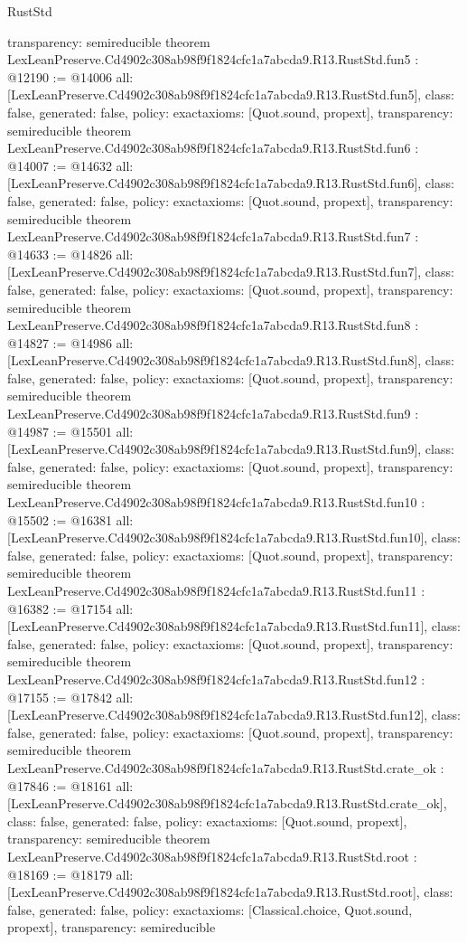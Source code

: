 \begin{lexlean}{RustStd}
\begin{coremodule}
{  transparency: semireducible
}
theorem LexLeanPreserve.Cd4902c308ab98f9f1824cfc1a7abcda9.R13.RustStd.fun5 : @12190 := @14006 {
  all: [LexLeanPreserve.Cd4902c308ab98f9f1824cfc1a7abcda9.R13.RustStd.fun5],
  class: false,
  generated: false,
  policy: exact{axioms: [Quot.sound, propext]},
  transparency: semireducible
}
theorem LexLeanPreserve.Cd4902c308ab98f9f1824cfc1a7abcda9.R13.RustStd.fun6 : @14007 := @14632 {
  all: [LexLeanPreserve.Cd4902c308ab98f9f1824cfc1a7abcda9.R13.RustStd.fun6],
  class: false,
  generated: false,
  policy: exact{axioms: [Quot.sound, propext]},
  transparency: semireducible
}
theorem LexLeanPreserve.Cd4902c308ab98f9f1824cfc1a7abcda9.R13.RustStd.fun7 : @14633 := @14826 {
  all: [LexLeanPreserve.Cd4902c308ab98f9f1824cfc1a7abcda9.R13.RustStd.fun7],
  class: false,
  generated: false,
  policy: exact{axioms: [Quot.sound, propext]},
  transparency: semireducible
}
theorem LexLeanPreserve.Cd4902c308ab98f9f1824cfc1a7abcda9.R13.RustStd.fun8 : @14827 := @14986 {
  all: [LexLeanPreserve.Cd4902c308ab98f9f1824cfc1a7abcda9.R13.RustStd.fun8],
  class: false,
  generated: false,
  policy: exact{axioms: [Quot.sound, propext]},
  transparency: semireducible
}
theorem LexLeanPreserve.Cd4902c308ab98f9f1824cfc1a7abcda9.R13.RustStd.fun9 : @14987 := @15501 {
  all: [LexLeanPreserve.Cd4902c308ab98f9f1824cfc1a7abcda9.R13.RustStd.fun9],
  class: false,
  generated: false,
  policy: exact{axioms: [Quot.sound, propext]},
  transparency: semireducible
}
theorem LexLeanPreserve.Cd4902c308ab98f9f1824cfc1a7abcda9.R13.RustStd.fun10 : @15502 := @16381 {
  all: [LexLeanPreserve.Cd4902c308ab98f9f1824cfc1a7abcda9.R13.RustStd.fun10],
  class: false,
  generated: false,
  policy: exact{axioms: [Quot.sound, propext]},
  transparency: semireducible
}
theorem LexLeanPreserve.Cd4902c308ab98f9f1824cfc1a7abcda9.R13.RustStd.fun11 : @16382 := @17154 {
  all: [LexLeanPreserve.Cd4902c308ab98f9f1824cfc1a7abcda9.R13.RustStd.fun11],
  class: false,
  generated: false,
  policy: exact{axioms: [Quot.sound, propext]},
  transparency: semireducible
}
theorem LexLeanPreserve.Cd4902c308ab98f9f1824cfc1a7abcda9.R13.RustStd.fun12 : @17155 := @17842 {
  all: [LexLeanPreserve.Cd4902c308ab98f9f1824cfc1a7abcda9.R13.RustStd.fun12],
  class: false,
  generated: false,
  policy: exact{axioms: [Quot.sound, propext]},
  transparency: semireducible
}
theorem LexLeanPreserve.Cd4902c308ab98f9f1824cfc1a7abcda9.R13.RustStd.crate_ok : @17846 := @18161 {
  all: [LexLeanPreserve.Cd4902c308ab98f9f1824cfc1a7abcda9.R13.RustStd.crate_ok],
  class: false,
  generated: false,
  policy: exact{axioms: [Quot.sound, propext]},
  transparency: semireducible
}
theorem LexLeanPreserve.Cd4902c308ab98f9f1824cfc1a7abcda9.R13.RustStd.root : @18169 := @18179 {
  all: [LexLeanPreserve.Cd4902c308ab98f9f1824cfc1a7abcda9.R13.RustStd.root],
  class: false,
  generated: false,
  policy: exact{axioms: [Classical.choice, Quot.sound, propext]},
  transparency: semireducible
}


\end{coremodule}
\end{lexlean}
